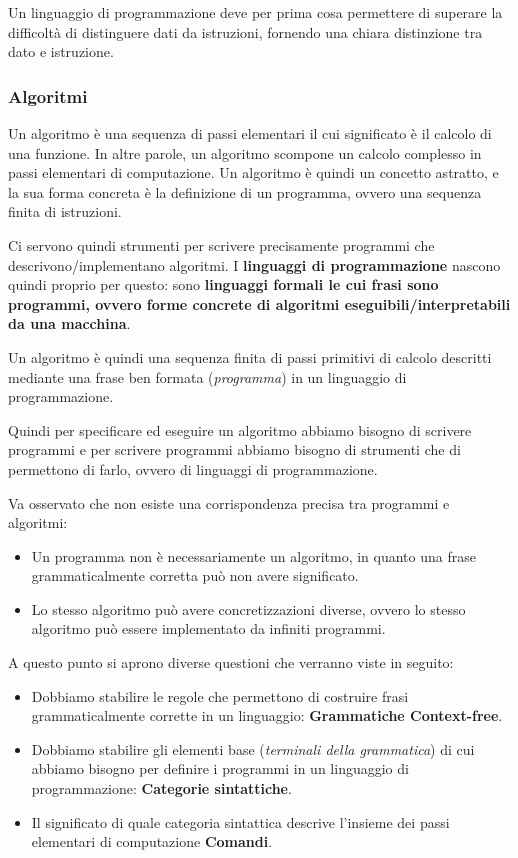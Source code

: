 \documentclass[oneside,a4paper,11pt]{book}
\theoremstyle{italicstyle}
\theoremstyle{normStyle}
\begin{document}
Un linguaggio di programmazione deve per prima cosa permettere di superare 
la difficoltà di distinguere dati da istruzioni, fornendo una chiara 
distinzione tra dato e istruzione.

\subsubsection{Algoritmi}
Un algoritmo è una sequenza di passi elementari il cui significato 
è il calcolo di una funzione. In altre parole, un algoritmo scompone 
un calcolo complesso in passi elementari di computazione. Un algoritmo 
è quindi un concetto astratto, e la sua forma concreta è la definizione 
di un programma, ovvero una sequenza finita di istruzioni.

Ci servono quindi strumenti per scrivere precisamente programmi che 
descrivono/implementano algoritmi. I \textbf{linguaggi di programmazione} 
nascono quindi proprio per questo: sono \textbf{linguaggi formali le cui 
frasi sono programmi, ovvero forme concrete di algoritmi eseguibili/interpretabili 
da una macchina}.

\begin{tcolorbox}[title={Algoritmo}]
Un algoritmo è quindi una sequenza finita di passi primitivi di calcolo 
descritti mediante una frase ben formata (\textit{programma}) in un linguaggio 
di programmazione. 
\end{tcolorbox}
Quindi per specificare ed eseguire un algoritmo abbiamo bisogno 
di scrivere programmi e per scrivere programmi abbiamo bisogno di strumenti che 
di permettono di farlo, ovvero di linguaggi di programmazione.

Va osservato che non esiste una corrispondenza precisa tra programmi 
e algoritmi:
\begin{itemize}
  \item Un programma non è necessariamente un algoritmo, in quanto 
  una frase grammaticalmente corretta può non avere significato.
  \item Lo stesso algoritmo può avere concretizzazioni diverse, ovvero lo stesso 
  algoritmo può essere implementato da infiniti programmi.
\end{itemize}
A questo punto si aprono diverse questioni che verranno viste in seguito:
\begin{itemize}
  \item Dobbiamo stabilire le regole che permettono di costruire 
  frasi grammaticalmente corrette in un linguaggio: \textbf{Grammatiche 
  Context-free}.
  \item Dobbiamo stabilire gli elementi base (\textit{terminali della grammatica})
  di cui abbiamo bisogno per definire i programmi in un linguaggio di programmazione: 
  \textbf{Categorie sintattiche}.
  \item Il significato di quale categoria sintattica descrive l'insieme dei 
  passi elementari di computazione \textbf{Comandi}.
\end{itemize}
\end{document}
